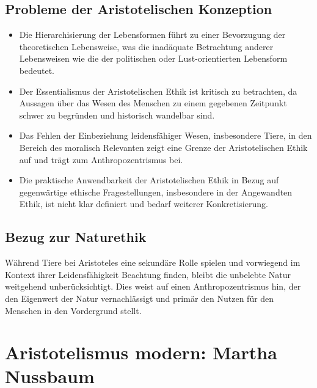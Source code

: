 \documentclass{article}
\begin{document}
\subsection*{Probleme der Aristotelischen Konzeption}

\begin{itemize}
	\item Die Hierarchisierung der Lebensformen führt zu einer Bevorzugung der theoretischen Lebensweise, was die inadäquate Betrachtung anderer Lebensweisen wie die der politischen oder Lust-orientierten Lebensform bedeutet.

	\item Der Essentialismus der Aristotelischen Ethik ist kritisch zu betrachten, da Aussagen über das Wesen des Menschen zu einem gegebenen Zeitpunkt schwer zu begründen und historisch wandelbar sind.

	\item Das Fehlen der Einbeziehung leidensfähiger Wesen, insbesondere Tiere, in den Bereich des moralisch Relevanten zeigt eine Grenze der Aristotelischen Ethik auf und trägt zum Anthropozentrismus bei.

	\item Die praktische Anwendbarkeit der Aristotelischen Ethik in Bezug auf gegenwärtige ethische Fragestellungen, insbesondere in der Angewandten Ethik, ist nicht klar definiert und bedarf weiterer Konkretisierung.
\end{itemize}

\subsection*{Bezug zur Naturethik}

Während Tiere bei Aristoteles eine sekundäre Rolle spielen und vorwiegend im Kontext ihrer Leidensfähigkeit Beachtung finden, bleibt die unbelebte Natur weitgehend unberücksichtigt. Dies weist auf einen Anthropozentrismus hin, der den Eigenwert der Natur vernachlässigt und primär den Nutzen für den Menschen in den Vordergrund stellt.


\newpage
\section{Aristotelismus modern: Martha Nussbaum}
\end{document}
